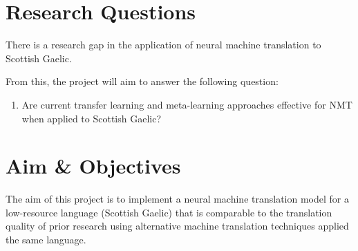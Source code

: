 
\section{Research Questions}
There is a research gap in the application of neural machine translation to Scottish Gaelic.

From this, the project will aim to answer the following question:

\begin{enumerate}
    \item Are current transfer learning and meta-learning approaches effective for \acrshort{NMT} when applied to Scottish Gaelic?
\end{enumerate}
\section{Aim \& Objectives}
The aim of this project is to implement a neural machine translation model for a low-resource language (Scottish Gaelic) that is comparable to the translation quality of prior research using alternative machine translation techniques applied the same language.

